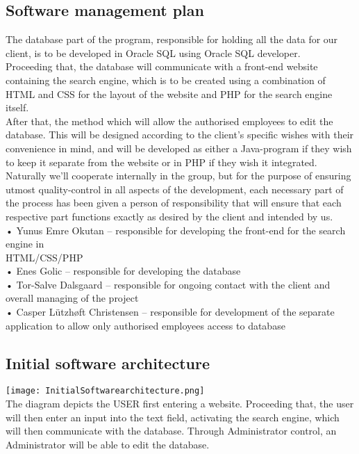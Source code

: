 \documentclass[12pt,a4paper]{article}
\begin{document}
\subsection{Software management plan}
The database part of the program, responsible for holding all the data for our client, is to be developed in Oracle SQL using Oracle SQL developer.\\
Proceeding that, the database will communicate with a front-end website containing the search engine, which is to be created using a combination of HTML and CSS for the layout of the website and PHP for the search engine itself.\\
After that, the method which will allow the authorised employees to edit the database. This will be designed according to the client’s specific wishes with their convenience in mind, and will be developed as either a Java-program if they wish to keep it separate from the website or in PHP if they wish it integrated.\\
Naturally we’ll cooperate internally in the group, but for the purpose of ensuring utmost quality-control in all aspects of the development, each necessary part of the process has been given a person of responsibility that will ensure that each respective part functions exactly as desired by the client and intended by us.\\

•	Yunus Emre Okutan – responsible for developing the front-end for the search engine in \\HTML/CSS/PHP\\
•	Enes Golic – responsible for developing the database\\
•	Tor-Salve Dalsgaard – responsible for ongoing contact with the client and overall managing of the project\\
•	Casper Lützhøft Christensen – responsible for development of the separate application to allow only authorised employees access to database\\

\subsection{Initial software architecture}
\texttt{[image: InitialSoftwarearchitecture.png]}\\
The diagram depicts the USER first entering a website. Proceeding that, the user will then enter an input into the text field, activating the search engine, which will then communicate with the database. Through Administrator control, an Administrator will be able to edit the database.	
\end{document}
